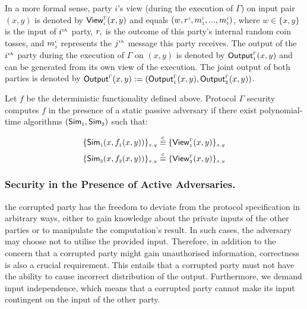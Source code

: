 In a more formal sense, party $i$’s view (during the execution of $\Gamma$) on input pair  $(x, y)$ is denoted by $\mathsf{View}_{\scriptscriptstyle i}^{\scriptscriptstyle \Gamma}(x,y)$ and equals $(w, r^{\scriptscriptstyle i}, m_{\scriptscriptstyle 1}^{\scriptscriptstyle i}, ..., m_{\scriptscriptstyle t}^{\scriptscriptstyle i})$, where $w\in\{x,y\}$ is the input of $i^{\scriptscriptstyle th}$ party, $r_{\scriptscriptstyle i}$ is the outcome of this party's internal random coin tosses, and $m_{\scriptscriptstyle j}^{\scriptscriptstyle i}$ represents the $j^{\scriptscriptstyle th}$ message this party receives.  The output of the $i^{\scriptscriptstyle th}$ party during the execution of $\Gamma$ on $(x, y)$ is denoted by $\mathsf{Output}_{\scriptscriptstyle 1}^{\scriptscriptstyle \Gamma}(x,y)$ and can be generated from its own view of the execution.  The joint output of both parties is denoted by $\mathsf{Output}^{\scriptscriptstyle \Gamma}(x,y):=(\mathsf{Output}_{\scriptscriptstyle 1}^{\scriptscriptstyle \Gamma}(x,y), \mathsf{Output}_{\scriptscriptstyle 2}^{\scriptscriptstyle \Gamma}(x,y))$.

\begin{definition}
Let $f$ be the deterministic functionality defined above. Protocol $\Gamma$ security computes $f$ in the presence of a static  passive adversary if there exist polynomial-time algorithms $(\mathsf {Sim}_{\scriptscriptstyle 1}, \mathsf {Sim}_{\scriptscriptstyle 2})$ such that:
\end{definition}
%
  \begin{equation*}
  \{\mathsf {Sim}_{\scriptscriptstyle 1}(x,f_{\scriptscriptstyle 1}(x,y))\}_{\scriptscriptstyle x,y}\stackrel{c}{\equiv} \{\mathsf{View}_{\scriptscriptstyle 1}^{\scriptscriptstyle \Gamma}(x,y) \}_{\scriptscriptstyle x,y}\\
  \end{equation*}
  \begin{equation*}
    \{\mathsf{Sim}_{\scriptscriptstyle 2}(x,f_{\scriptscriptstyle 2}(x,y))\}_{\scriptscriptstyle x,y}\stackrel{c}{\equiv} \{\mathsf{View}_{\scriptscriptstyle 2}^{\scriptscriptstyle \Gamma}(x,y) \}_{\scriptscriptstyle x,y}
  \end{equation*}
  

\vs

 \subsubsection{Security in the Presence of Active Adversaries.}  
 
 
the corrupted party has the freedom to deviate from the protocol specification in arbitrary ways, either to gain knowledge about the private inputs of the other parties or to manipulate the computation's result. In such cases, the adversary may choose not to utilise the provided input. Therefore, in addition to the concern that a corrupted party might gain unauthorised information, correctness is also a crucial requirement. This entails that a corrupted party must not have the ability to cause incorrect distribution of the output. Furthermore, we demand input independence, which means that a corrupted party cannot make its input contingent on the input of the other party.


